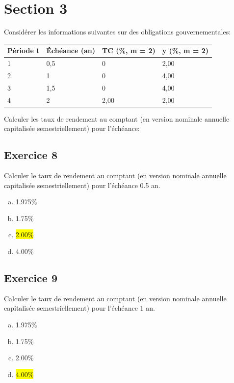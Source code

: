 \documentclass[10pt,a4paper]{article}
\begin{document}
\section*{Section 3}
Considérer les informations suivantes sur des obligations gouvernementales: 

\begin{table}[H]
\begin{center}
\begin{tabular}{|l|l|l|l|}
\hline
Période t & Échéance (an) & TC (\%, m = 2) & y (\%, m = 2) \\ \hline
1         & 0,5           & 0              & 2,00          \\ \hline
2         & 1             & 0              & 4,00          \\ \hline
3         & 1,5           & 0              & 4,00          \\ \hline
4         & 2             & 2,00           & 2,00          \\ \hline
\end{tabular}
\end{center}
\end{table}

Calculer les taux de rendement au comptant (en version nominale annuelle capitalisée semestriellement) pour l'échéance:

\subsection*{Exercice 8}
Calculer le taux de rendement au comptant (en version nominale annuelle capitalisée semestriellement) pour l'échéance 0.5 an.

\begin{enumerate}[a)]
\item 1.975\%
\item 1.75\%
\item  \hl{2.00\%}
\item 4.00\%
\end{enumerate}



\subsection*{Exercice 9}
Calculer le taux de rendement au comptant (en version nominale annuelle capitalisée semestriellement) pour l'échéance 1 an.

\begin{enumerate}[a)]
\item 1.975\%
\item 1.75\%
\item 2.00\%
\item  \hl{4.00\%}
\end{enumerate}
\end{document}

